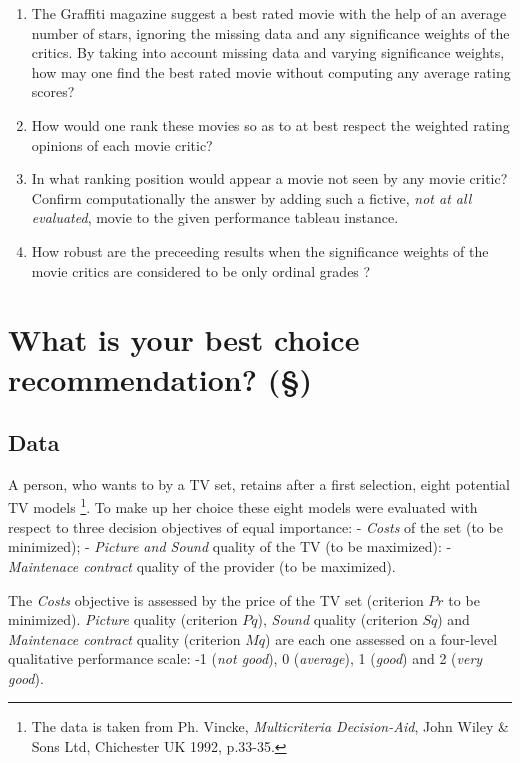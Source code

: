 \begin{enumerate}
\item The Graffiti magazine suggest a best rated movie with the help of an average number of stars, ignoring the missing data and any significance weights of the critics. By taking into account missing data and varying significance weights, how may one find the best rated movie without computing any average rating scores?
\item How would one rank these movies so as to at best respect the weighted rating opinions of each movie critic?
\item In what ranking position would appear a movie not seen by any movie critic? Confirm computationally the answer by adding such a fictive, \emph{not at all evaluated}, movie to the given performance tableau instance.
\item How robust are the preceeding results when the significance weights of the movie critics are considered to be only ordinal grades ?
\end{enumerate}

\section{What is your best choice recommendation? (§)}
\label{sec:15.3}


\subsection{Data}
\label{sec:15.3.1}

A person, who wants to by a TV set, retains after a first selection, eight potential TV models \footnote{The data is taken from Ph. Vincke, \emph{Multicriteria Decision-Aid}, John Wiley \& Sons Ltd, Chichester UK 1992, p.33-35.}. To make up her choice these eight models were evaluated with respect to three decision objectives of equal importance: - \emph{Costs} of the set (to be minimized); - \emph{Picture and Sound} quality of the TV (to be maximized): - \emph{Maintenace contract} quality of the provider (to be maximized).

The \emph{Costs} objective is assessed by the price of the TV set (criterion $Pr$ to be minimized). \emph{Picture} quality (criterion $Pq$), \emph{Sound} quality (criterion $Sq$) and \emph{Maintenace contract} quality (criterion $Mq$) are each one assessed on a four-level qualitative performance scale: -1 (\emph{not good}), 0 (\emph{average}), 1 (\emph{good}) and 2 (\emph{very good}).

